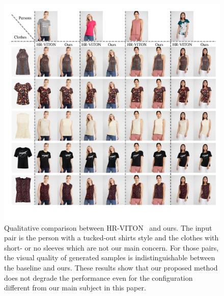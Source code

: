 \begin{figure}[t!]
    \centering
     \includegraphics[width=\textwidth]{fig_supp/fig_supp_causal.pdf}
     \caption{Qualitative comparison between HR-VITON~\cite{lee2022hrviton} and ours. The input pair is the person with a tucked-out shirts style and the clothes with short- or no sleeves which are not our main concern. For those pairs, the visual quality of generated samples is indistinguishable between the baseline and ours. These results show that our proposed method does not degrade the performance even for the configuration different from our main subject in this paper.
     \label{fig_supp_causal}
     }
\end{figure}

